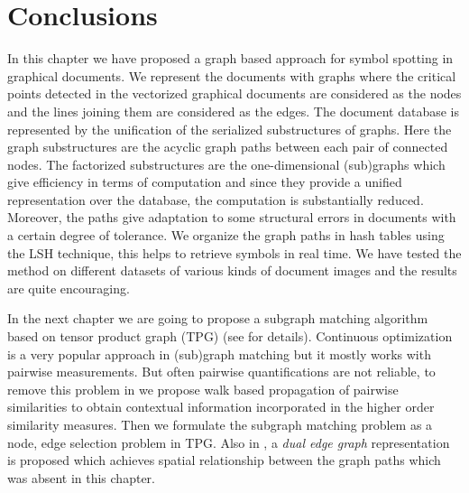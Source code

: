 \section{Conclusions}
\label{sec:hssg:concl}
In this chapter we have proposed a graph based approach for symbol spotting in graphical documents. We represent the documents with graphs where the critical points detected in the vectorized graphical documents are considered as the nodes and the lines joining them are considered as the edges. The document database is represented by the unification of the serialized substructures of graphs. Here the graph substructures are the acyclic graph paths between each pair of connected nodes. The factorized substructures are the one-dimensional (sub)graphs which give efficiency in terms of computation and since they provide a unified representation over the database, the computation is substantially reduced. Moreover, the paths give adaptation to some structural errors in documents with a certain degree of tolerance. We organize the graph paths in hash tables using the LSH technique, this helps to retrieve symbols in real time. We have tested the method on different datasets of various kinds of document images and the results are quite encouraging.

In the next chapter we are going to propose a subgraph matching algorithm based on tensor product graph (TPG) (see  for details). Continuous optimization is a very popular approach in (sub)graph matching but it mostly works with pairwise measurements. But often pairwise quantifications are not reliable, to remove this problem in  we propose walk based propagation of pairwise similarities to obtain contextual information incorporated in the higher order similarity measures. Then we formulate the subgraph matching problem as a node, edge selection problem in TPG. Also in , a \emph{dual edge graph} representation is proposed which achieves spatial relationship between the graph paths which was absent in this chapter.